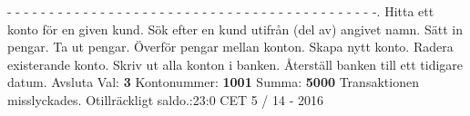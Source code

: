 \newline
- - - - - - - - - - - - - - - - - - - - - - - - - - - - - - - - - - - - - - - - - - - -.   Hitta ett konto för en given kund.   Sök efter en kund utifrån (del av) angivet namn.   Sätt in pengar.   Ta ut pengar.   Överför pengar mellan konton.   Skapa nytt konto.   Radera existerande konto.   Skriv ut alla konton i banken.   Återställ banken till ett tidigare datum. Avsluta\newline
Val: \textbf{3}\newline
Kontonummer: \textbf{1001}\newline
Summa: \textbf{5000}\newline
Transaktionen misslyckades.  Otillräckligt saldo.:23:0 CET 5 / 14 - 2016\newline
\newline
